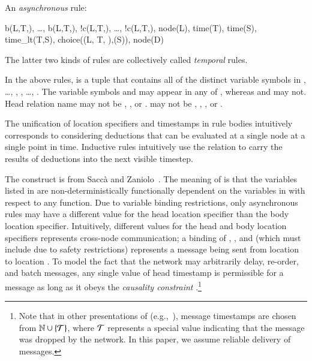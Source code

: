 An {\em asynchronous} rule:

\begin{Drules}
        {b(L,T,), \ldots, b(L,T,),
          !c(L,T,), \ldots, !c(L,T,),
          node(L), time(T), time(S), time_lt(T,S), choice((L, T, ),(S)), node(D)}
\end{Drules}

The latter two kinds of rules are collectively called {\em temporal} rules.

In the above rules,  is a tuple that contains all of the distinct variable
symbols in , \ldots, , , \ldots,
.  The variable symbols  and  may appear in
any of , whereas  and  may not.
Head relation name  may not be , , or .
 may not be
, , , or \dedalus{<}.

The unification of location specifiers and timestamps in rule bodies intuitively corresponds to considering deductions that can be evaluated at a single node at a single point in time.  Inductive rules intuitively use the  relation to carry the results of deductions into the next visible timestep.

The  construct is from Sacc\`{a} and Zaniolo~\cite{sacca-zaniolo}.
The meaning of  is that the variables listed
in  are non-deterministically functionally dependent on the variables in  with respect to
any function.  Due to variable binding restrictions, only asynchronous rules may
have a different value for the head location specifier than the body location
specifier.  Intuitively, different values for the head and body location specifiers represents
cross-node communication; a binding of , , and 
(which must include  due to safety restrictions) represents a message
being sent from location  to location .  To model the fact
that the network may arbitrarily delay, re-order, and batch messages, any single
value of head timestamp  is permissible for a message as long as it
obeys the {\em causality constraint} .\footnote{Note that in
  other presentations of \lang (e.g.,~\cite{dedalus}), message timestamps are
  chosen from $\mathbb{N} \cup \{\Tau\}$, where $\Tau$ represents a special value
  indicating that the message was dropped by the network. In this paper, we
  assume reliable delivery of messages.}

